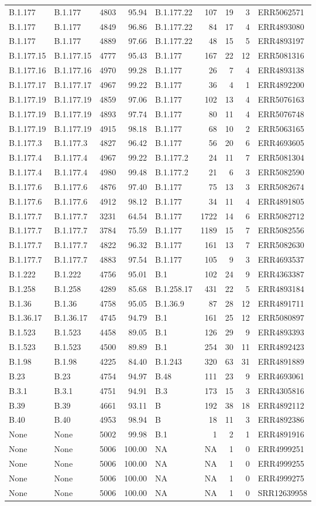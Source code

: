 \documentclass[
]{article}
\begin{document}
\begin{longtable}[]{@{}llrrlrrrl@{}}
B.1.177 & B.1.177 & 4803 & 95.94 & B.1.177.22 & 107 & 19 & 3 &
ERR5062571\tabularnewline
B.1.177 & B.1.177 & 4849 & 96.86 & B.1.177.22 & 84 & 17 & 4 &
ERR4893080\tabularnewline
B.1.177 & B.1.177 & 4889 & 97.66 & B.1.177.22 & 48 & 15 & 5 &
ERR4893197\tabularnewline
B.1.177.15 & B.1.177.15 & 4777 & 95.43 & B.1.177 & 167 & 22 & 12 &
ERR5081316\tabularnewline
B.1.177.16 & B.1.177.16 & 4970 & 99.28 & B.1.177 & 26 & 7 & 4 &
ERR4893138\tabularnewline
B.1.177.17 & B.1.177.17 & 4967 & 99.22 & B.1.177 & 36 & 4 & 1 &
ERR4892200\tabularnewline
B.1.177.19 & B.1.177.19 & 4859 & 97.06 & B.1.177 & 102 & 13 & 4 &
ERR5076163\tabularnewline
B.1.177.19 & B.1.177.19 & 4893 & 97.74 & B.1.177 & 80 & 11 & 4 &
ERR5076748\tabularnewline
B.1.177.19 & B.1.177.19 & 4915 & 98.18 & B.1.177 & 68 & 10 & 2 &
ERR5063165\tabularnewline
B.1.177.3 & B.1.177.3 & 4827 & 96.42 & B.1.177 & 56 & 20 & 6 &
ERR4693605\tabularnewline
B.1.177.4 & B.1.177.4 & 4967 & 99.22 & B.1.177.2 & 24 & 11 & 7 &
ERR5081304\tabularnewline
B.1.177.4 & B.1.177.4 & 4980 & 99.48 & B.1.177.2 & 21 & 6 & 3 &
ERR5082590\tabularnewline
B.1.177.6 & B.1.177.6 & 4876 & 97.40 & B.1.177 & 75 & 13 & 3 &
ERR5082674\tabularnewline
B.1.177.6 & B.1.177.6 & 4912 & 98.12 & B.1.177 & 34 & 11 & 4 &
ERR4891805\tabularnewline
B.1.177.7 & B.1.177.7 & 3231 & 64.54 & B.1.177 & 1722 & 14 & 6 &
ERR5082712\tabularnewline
B.1.177.7 & B.1.177.7 & 3784 & 75.59 & B.1.177 & 1189 & 15 & 7 &
ERR5082556\tabularnewline
B.1.177.7 & B.1.177.7 & 4822 & 96.32 & B.1.177 & 161 & 13 & 7 &
ERR5082630\tabularnewline
B.1.177.7 & B.1.177.7 & 4883 & 97.54 & B.1.177 & 105 & 9 & 3 &
ERR4693537\tabularnewline
B.1.222 & B.1.222 & 4756 & 95.01 & B.1 & 102 & 24 & 9 &
ERR4363387\tabularnewline
B.1.258 & B.1.258 & 4289 & 85.68 & B.1.258.17 & 431 & 22 & 5 &
ERR4893184\tabularnewline
B.1.36 & B.1.36 & 4758 & 95.05 & B.1.36.9 & 87 & 28 & 12 &
ERR4891711\tabularnewline
B.1.36.17 & B.1.36.17 & 4745 & 94.79 & B.1 & 161 & 25 & 12 &
ERR5080897\tabularnewline
B.1.523 & B.1.523 & 4458 & 89.05 & B.1 & 126 & 29 & 9 &
ERR4893393\tabularnewline
B.1.523 & B.1.523 & 4500 & 89.89 & B.1 & 254 & 30 & 11 &
ERR4892423\tabularnewline
B.1.98 & B.1.98 & 4225 & 84.40 & B.1.243 & 320 & 63 & 31 &
ERR4891889\tabularnewline
B.23 & B.23 & 4754 & 94.97 & B.48 & 111 & 23 & 9 &
ERR4693061\tabularnewline
B.3.1 & B.3.1 & 4751 & 94.91 & B.3 & 173 & 15 & 3 &
ERR4305816\tabularnewline
B.39 & B.39 & 4661 & 93.11 & B & 192 & 38 & 18 &
ERR4892112\tabularnewline
B.40 & B.40 & 4953 & 98.94 & B & 18 & 11 & 3 & ERR4892386\tabularnewline
None & None & 5002 & 99.98 & B.1 & 1 & 2 & 1 & ERR4891916\tabularnewline
None & None & 5006 & 100.00 & NA & NA & 1 & 0 &
ERR4999251\tabularnewline
None & None & 5006 & 100.00 & NA & NA & 1 & 0 &
ERR4999255\tabularnewline
None & None & 5006 & 100.00 & NA & NA & 1 & 0 &
ERR4999275\tabularnewline
None & None & 5006 & 100.00 & NA & NA & 1 & 0 &
SRR12639958\tabularnewline
\bottomrule
\end{longtable}
\end{document}

